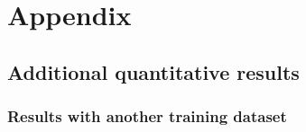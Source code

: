 \documentclass[runningheads]{llncs}
\begin{document}



\clearpage
\chapter*{Appendix}
\vspace{-30pt}

\appendix
\setcounter{section}{0}
\renewcommand{\thesection}{\Alph{section}}

\renewcommand{\contentsname}{Table of Contents\vspace{-10pt}}
{
\hypersetup{linkcolor=black}
\tableofcontents
}











\section{Additional quantitative results}


\subsection{Results with another training dataset}
\label{sec:nuscenes_results}
\end{document}
